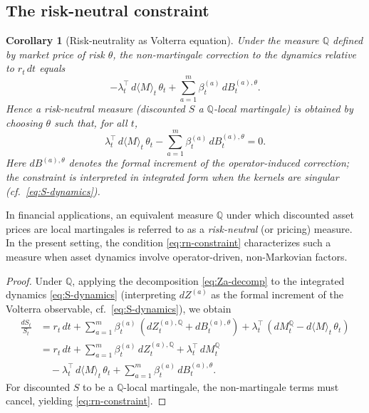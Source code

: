 \documentclass[11pt]{article}
\theoremstyle{plain}
\newtheorem{corollary}{Corollary}[section]
\theoremstyle{definition}
\theoremstyle{remark}
\newcommand{\QQ}{\mathbb{Q}}
\newcommand{\bracket}[1]{\langle #1 \rangle}
\begin{document}
\subsection{The risk-neutral constraint}

\begin{corollary}[Risk-neutrality as Volterra equation]\label{cor:rn-constraint}
Under the measure $\QQ$ defined by market price of risk $\theta$, the
non-martingale correction to the dynamics relative to $r_t\,dt$ equals
\[
-\lambda_t^\top\,d\bracket{M}_t\,\theta_t + \sum_{a=1}^m \beta_t^{(a)}\,dB_t^{(a),\theta}.
\]
Hence a risk-neutral measure (discounted $S$ a $\QQ$-local martingale) is
obtained by choosing $\theta$ such that, for all $t$,
\begin{equation}\label{eq:rn-constraint}
\lambda_t^\top\,d\bracket{M}_t\,\theta_t - \sum_{a=1}^m \beta_t^{(a)}\,dB_t^{(a),\theta} = 0.
\end{equation}
Here $dB^{(a),\theta}$ denotes the formal increment of the operator-induced
correction; the constraint is interpreted in integrated form when the kernels
are singular (cf.\ \eqref{eq:S-dynamics}).
\end{corollary}

In financial applications, an equivalent measure $\QQ$ under which discounted
asset prices are local martingales is referred to as a \emph{risk-neutral}
(or pricing) measure. In the present setting, the condition
\eqref{eq:rn-constraint} characterizes such a measure when asset dynamics
involve operator-driven, non-Markovian factors.

\begin{proof}
Under $\QQ$, applying the decomposition \eqref{eq:Za-decomp} to the
integrated dynamics \eqref{eq:S-dynamics} (interpreting $dZ^{(a)}$ as the
formal increment of the Volterra observable, cf.\ \eqref{eq:S-dynamics}),
we obtain
\begin{align*}
\frac{dS_t}{S_t} &= r_t\,dt + \sum_{a=1}^m \beta_t^{(a)}\,(dZ_t^{(a),\QQ} + dB_t^{(a),\theta})
+ \lambda_t^\top\,(dM_t^{\QQ} - d\bracket{M}_t\,\theta_t) \\
&= r_t\,dt + \sum_{a=1}^m \beta_t^{(a)}\,dZ_t^{(a),\QQ} + \lambda_t^\top\,dM_t^{\QQ} \\
&\quad - \lambda_t^\top\,d\bracket{M}_t\,\theta_t + \sum_{a=1}^m \beta_t^{(a)}\,dB_t^{(a),\theta}.
\end{align*}
For discounted $S$ to be a $\QQ$-local martingale, the non-martingale terms
must cancel, yielding \eqref{eq:rn-constraint}.
\end{proof}
\end{document}
